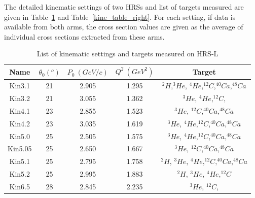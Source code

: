  The detailed kinematic settings of two HRSs and list of targets measured are given in Table~\ref{kine_table_left} and Table~\ref{kine_table_right}. For each setting, if data is available from both arms, the cross section values are given as the average of individual cross sections extracted from these arms. 
\begin{table}[!ht]
  \centering
  \begin{tabular}{|c|c|c|c|c|}
    \hline
    Name      &  $\theta_{0} (^{o})$    & $P_{0}~(GeV/c)$ & $Q^{2}~(GeV^{2})$ &  Target \\
    \hline 
     Kin3.1   &21     & 2.905           & 1.295        & $^{2}H$,$^{3}He$, $^{4}He$,$^{12}C$,$^{40}Ca$,$^{48}Ca$ \\
    \hline                      
     Kin3.2   &21     & 3.055           & 1.362        &         $^{3}He$, $^{4}He$,$^{12}C$,                    \\
     \hline 
     Kin4.1   &23     & 2.855           & 1.523        &         $^{3}He$,          $^{12}C$,$^{40}Ca$,$^{48}Ca$ \\
      \hline 
     Kin4.2   &23     & 3.035           & 1.619        &         $^{3}He$, $^{4}He$,$^{12}C$,$^{40}Ca$,$^{48}Ca$ \\
     \hline 
     Kin5.0   &25     & 2.505           & 1.575        &         $^{3}He$, $^{4}He$,$^{12}C$,$^{40}Ca$,$^{48}Ca$ \\
     \hline 
     Kin5.05  &25     & 2.650           & 1.667        &         $^{3}He$,         $^{12}C$,$^{40}Ca$,$^{48}Ca$ \\
     \hline    
     Kin5.1   &25     & 2.795           & 1.758        &$^{2}H$, $^{3}He$, $^{4}He$,$^{12}C$,$^{40}Ca$,$^{48}Ca$ \\
     \hline    
     Kin5.2   &25     & 2.995           & 1.883        &$^{2}H$, $^{3}He$, $^{4}He$,$^{12}C$                     \\
    \hline 
     Kin6.5   &28     & 2.845           & 2.235        &          $^{3}He$,        $^{12}C$,                    \\
    \hline 
   \end{tabular}
  \caption[List of kinematic settings and target measured on HRS-L]{List of kinematic settings and targets measured on HRS-L}
  \label{kine_table_left}	
\end{table}
